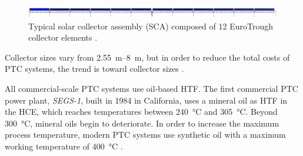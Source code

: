 \begin{figure}[htbp] 
\centering
\includegraphics[width=1\linewidth]{FIG/SCA_EuroTrough}
\caption[Typical solar collector assembly composed of 12 EuroTrough collector elements.]{Typical solar collector assembly (SCA) composed of 12 EuroTrough collector elements \cite{VonReeken2014}.}\label{SCA_EuroTrough}
\end{figure}
%

Collector sizes vary from \SIrange{2.55}{8}{\metre}, but in order to reduce the total costs of PTC systems, the trend is toward collector sizes \cite{AbengoaSolar2013b,Pitz-Paal.2013,VonReeken2014}.

All commercial-scale PTC systems use oil-based HTF. The first commercial PTC power plant, \emph{SEGS-1}, built in 1984 in California, uses a mineral oil as HTF in the HCE, which reaches temperatures between \SI{240}{\celsius} and \SI{305}{\celsius}. Beyond \SI{300}{\celsius}, mineral oils begin to deteriorate. In order to increase the maximum process temperature, modern PTC systems use synthetic oil with a maximum working temperature of \SI{400}{\celsius} \cite{Gil2010,Richter2013,Therminol2015}.

%

